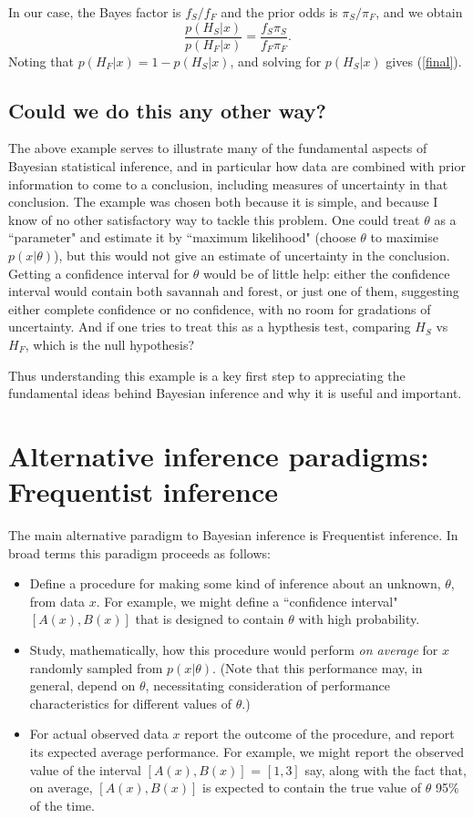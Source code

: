 \documentclass[times,11pt]{article}
\def\s{\mbox{savannah}}
\def\f{\mbox{forest}}
\def\ffA{f_F}
\def\fsA{f_S}
\def\pif{\pi_F}
\def\pis{\pi_S}
\def\Hf{H_F}
\def\Hs{H_S}
\begin{document}
In our case, the Bayes factor is $\fsA/\ffA$ and the prior odds is $\pis/\pif$, and we obtain
\begin{equation}
\frac{p(\Hs | x)}{p(\Hf | x)} = \frac{\fsA\pis}{\ffA \pif}.
\end{equation}
Noting that $p(\Hf|x) = 1-p(\Hs|x)$, and solving for $p(\Hs |x)$ gives (\ref{final}).

\subsection*{Could we do this any other way?}

The above example serves to illustrate many of the fundamental aspects of Bayesian statistical inference, and in particular how data are combined with prior information to come to a conclusion, including measures of uncertainty in that conclusion. The example was chosen both because it is simple, and because
I know of no other satisfactory way to tackle this problem. One could treat $\theta$ as a ``parameter" and estimate it by ``maximum likelihood" (choose $\theta$ to maximise $p(x|\theta)$), but this would not give an estimate of uncertainty in the conclusion. Getting a confidence interval for $\theta$ would be of little help: either the confidence interval would contain both $\s$ and $\f$, or just one of them, suggesting either complete confidence or no confidence, with no room for gradations of uncertainty. And if one tries to treat this as a hypthesis test, comparing $\Hs$ vs $\Hf$, which is the null hypothesis? 

Thus understanding this example is a key first step to appreciating
the fundamental ideas behind Bayesian inference and why it is useful and important. 


\section*{Alternative inference paradigms: Frequentist inference}

The main alternative paradigm to Bayesian inference is Frequentist inference.
In broad terms this paradigm proceeds as follows:
\begin{itemize}
\item Define a procedure for making some kind of inference about an unknown, $\theta$, from data $x$. 
For example, we might define a ``confidence interval" $[A(x),B(x)]$ that is designed to contain $\theta$ with high probability.
\item Study, mathematically, how this procedure would perform {\it on average} for $x$ randomly sampled from $p(x|\theta)$. (Note that this performance 
may, in general, depend on $\theta$, necessitating consideration of performance characteristics for different values of $\theta$.)
\item For actual observed data $x$ report the outcome of the procedure, and report its expected average performance.
For example, we might report the observed value of the interval $[A(x),B(x)]$ = $[1,3]$ say, along with the fact that, on average, $[A(x),B(x)]$
is expected to contain the true value of $\theta$ 95\% of the time.
\end{itemize}
\end{document}
